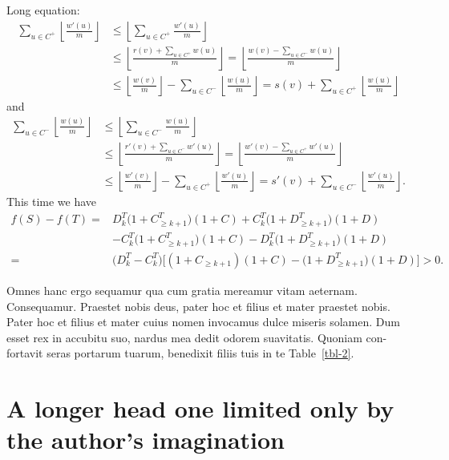 \documentclass{jdsart}
\theoremstyle{plain}
\theoremstyle{remark}
\theoremstyle{definition}
\begin{document}
Long equation:
%
\begin{align}
\sum_{u\in C^+}\left\lfloor{\frac{w'(u)}{m}} \right\rfloor 
    & \le \left\lfloor\sum_{u\in C^+} {\frac{w'(u)}{m}} \right\rfloor \nonumber \\
    & \le \left\lfloor{\frac{r(v)+\sum_{u\in C^+} w(u)}{m}} \right \rfloor = \left\lfloor{\frac{w(v)-\sum_{u\in C^-} w(u)}{m}} \right \rfloor \nonumber \\
    & \le \left\lfloor{\frac{w(v)}{m}} \right\rfloor -\sum_{u\in C^-}\left\lfloor{\frac{w(u)}{m}} \right\rfloor = s(v)+\sum_{u\in C^+}\left\lfloor{\frac{w(u)}{m}} \right\rfloor
\end{align}
%
and
%
\begin{align}
\sum_{u\in C^-}\left\lfloor{\frac{w(u)}{m}} \right\rfloor
    & \le \left\lfloor\sum_{u\in C^-} {\frac{w(u)}{m}} \right\rfloor \nonumber \\
    & \le \left\lfloor{\frac{r'(v)+\sum_{u\in C^-} w'(u)}{m}} \right \rfloor = \left\lfloor{\frac{w'(v)-\sum_{u\in C^+} w'(u)}{m}} \right\rfloor \nonumber\\
    & \le \left\lfloor{\frac{w'(v)}{m}} \right\rfloor -\sum_{u\in C^+}\left\lfloor{\frac{w'(u)}{m}} \right\rfloor = s'(v)+\sum _{u\in C^-}\left\lfloor{\frac{w'(u)}{m}} \right\rfloor .
\end{align}
%
This time we have
%
\begin{align}
f(S)-f(T) = {} & D_k^T\bigl(1+C_{\geq k+1}^T\bigr)(1 + C) + C_k^T\bigl(1+D_{\geq k+1}^T\bigr)(1 + D) \nonumber    \\
            {} & - C_k^T\bigl(1+C_{\geq k+1}^T\bigr)(1 + C) - D_k^T\bigl (1+D_{\geq k+1}^T\bigr)(1 + D) \nonumber \\
          = {} & \bigl(D_k^T-C_k^T\bigr)\bigl[(1+C_{\geq k+1})(1+C)-\bigl (1+D_{\geq k+1}^T\bigr)(1+D)\bigr]>0.
\end{align}

Omnes hanc ergo sequamur qua cum gratia mereamur vitam aeternam.
Consequamur. Praestet nobis deus, pater hoc et filius et mater
praestet nobis.  Pater hoc et filius et mater cuius nomen invocamus
dulce miseris solamen. Dum esset rex in accubitu suo, nardus mea
dedit odorem suavitatis. Quoniam con-fortavit seras portarum tuarum,
benedixit filiis tuis in te Table~\ref{tbl-2}.



\section{A longer head one limited only by the author's imagination}
\end{document}
